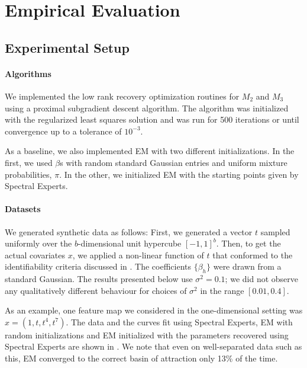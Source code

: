 \section{Empirical Evaluation}
\label{sec:evaluation}

\subsection{Experimental Setup}

\paragraph{Algorithms}

We implemented the low rank recovery optimization routines for $M_2$ and
$M_3$ using a proximal subgradient descent
algorithm.%
The algorithm
was initialized with the regularized least squares solution and was run
for 500 iterations or until convergence up to a tolerance of $10^{-3}$.

As a baseline, we also implemented EM with two different
initializations. In the first, we used $\beta$s with random standard
Gaussian entries and uniform mixture probabilities, $\pi$. In the other,
we initialized EM with the starting points given by Spectral Experts. 

\paragraph{Datasets}

We generated synthetic data as follows:
First, we generated a vector $t$ sampled uniformly over the $b$-dimensional
unit hypercube $[-1,1]^b$.
Then, to get the actual covariates $x$, we applied a non-linear function of $t$
that conformed to the identifiability criteria discussed in
.
The coefficients $\{\beta_h\}$ were drawn from a standard Gaussian. The
results presented below use $\sigma^2 = 0.1$; we did not observe any
qualitatively different behaviour for choices of $\sigma^2$ in the range
$[0.01, 0.4]$.  

As an example, one feature map we considered in the one-dimensional
setting was $x = (1, t, t^4, t^7)$. The data and the curves fit using
Spectral Experts, EM with random initializations and EM initialized with
the parameters recovered using Spectral Experts are shown in
. We note that even on well-separated data such as
this, EM converged to the correct basin of attraction only 13\% of the time.

